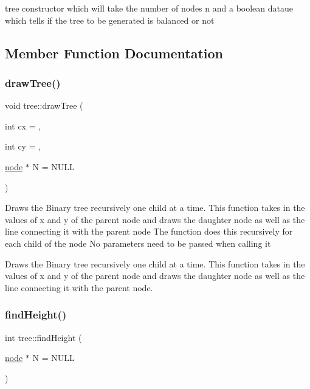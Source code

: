tree constructor which will take the number of nodes n and a boolean dataue which tells if the tree to be generated is balanced or not 

\subsection{Member Function Documentation}
\mbox{\label{classtree_a09613a8cf3f28dfa51dfd06ceeb90fa0}} 
\subsubsection{\texorpdfstring{draw\+Tree()}{drawTree()}}
{\footnotesize\ttfamily void tree\+::draw\+Tree (\begin{DoxyParamCaption}\item[{int}]{cx = {},  }\item[{int}]{cy = {},  }\item[{\hyperlink{structnode}{node} $\ast$}]{N = {\ttfamily NULL} }\end{DoxyParamCaption})\hspace{0.3cm}{\ttfamily [private]}}

Draws the Binary tree recursively one child at a time. This function takes in the values of x and y of the parent node and draws the daughter node as well as the line connecting it with the parent node The function does this recursively for each child of the node No parameters need to be passed when calling it

Draws the Binary tree recursively one child at a time. This function takes in the values of x and y of the parent node and draws the daughter node as well as the line connecting it with the parent node. \mbox{\label{classtree_ac07199db0ed26e80db1ec481bcba7380}} 
\subsubsection{\texorpdfstring{find\+Height()}{findHeight()}}
{\footnotesize\ttfamily int tree\+::find\+Height (\begin{DoxyParamCaption}\item[{\hyperlink{structnode}{node} $\ast$}]{N = {\ttfamily NULL} }\end{DoxyParamCaption})\hspace{0.3cm}{\ttfamily [private]}}

